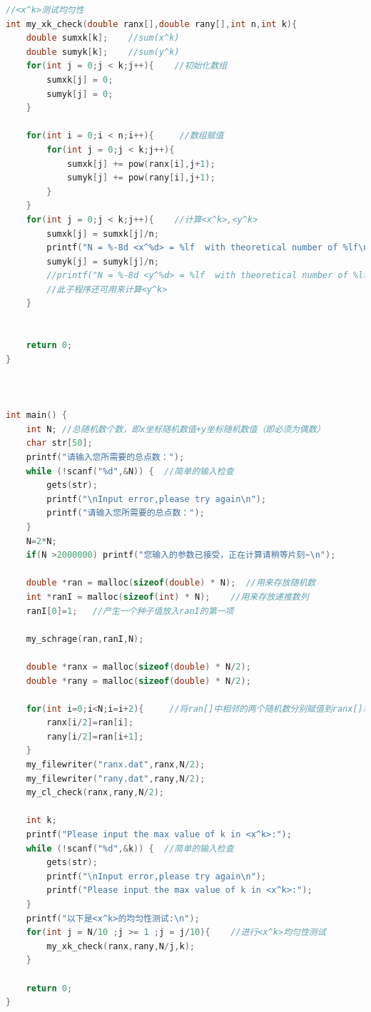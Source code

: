 \documentclass[a4paper,11pt]{article}
\begin{document}
\begin{appendices}
\begin{lstlisting}[language = C]
//<x^k>测试均匀性
int my_xk_check(double ranx[],double rany[],int n,int k){
    double sumxk[k];    //sum(x^k)
    double sumyk[k];    //sum(y^k)
    for(int j = 0;j < k;j++){    //初始化数组
        sumxk[j] = 0;
        sumyk[j] = 0;
    }

    for(int i = 0;i < n;i++){     //数组赋值
        for(int j = 0;j < k;j++){
            sumxk[j] += pow(ranx[i],j+1);
            sumyk[j] += pow(rany[i],j+1);
        }
    }
    for(int j = 0;j < k;j++){    //计算<x^k>,<y^k>
        sumxk[j] = sumxk[j]/n;
        printf("N = %-8d <x^%d> = %lf  with theoretical number of %lf\n",n,j+1,sumxk[j],1.0/(2+j));
        sumyk[j] = sumyk[j]/n;
        //printf("N = %-8d <y^%d> = %lf  with theoretical number of %lf\n",n,j+1,sumyk[j],1.0/(2+j));
        //此子程序还可用来计算<y^k>
    }


    return 0;
}



int main() {
    int N; //总随机数个数，即x坐标随机数值+y坐标随机数值（即必须为偶数）
    char str[50];
    printf("请输入您所需要的总点数：");
    while (!scanf("%d",&N)) {  //简单的输入检查
        gets(str);
        printf("\nInput error,please try again\n");
        printf("请输入您所需要的总点数：");
    }
    N=2*N;
    if(N >2000000) printf("您输入的参数已接受，正在计算请稍等片刻~\n");

    double *ran = malloc(sizeof(double) * N);  //用来存放随机数
    int *ranI = malloc(sizeof(int) * N);    //用来存放递推数列
    ranI[0]=1;   //产生一个种子值放入ranI的第一项

    my_schrage(ran,ranI,N);
    
    double *ranx = malloc(sizeof(double) * N/2);
    double *rany = malloc(sizeof(double) * N/2);

    for(int i=0;i<N;i=i+2){     //将ran[]中相邻的两个随机数分别赋值到ranx[]和rany[]
        ranx[i/2]=ran[i];
        rany[i/2]=ran[i+1];
    }
    my_filewriter("ranx.dat",ranx,N/2);
    my_filewriter("rany.dat",rany,N/2);
    my_cl_check(ranx,rany,N/2);

    int k;
    printf("Please input the max value of k in <x^k>:");
    while (!scanf("%d",&k)) {  //简单的输入检查
        gets(str);
        printf("\nInput error,please try again\n");
        printf("Please input the max value of k in <x^k>:");
    }
    printf("以下是<x^k>的均匀性测试:\n");
    for(int j = N/10 ;j >= 1 ;j = j/10){    //进行<x^k>均匀性测试
        my_xk_check(ranx,rany,N/j,k);
    }

    return 0;
}
\end{lstlisting}


\end{appendices}
\end{document}
